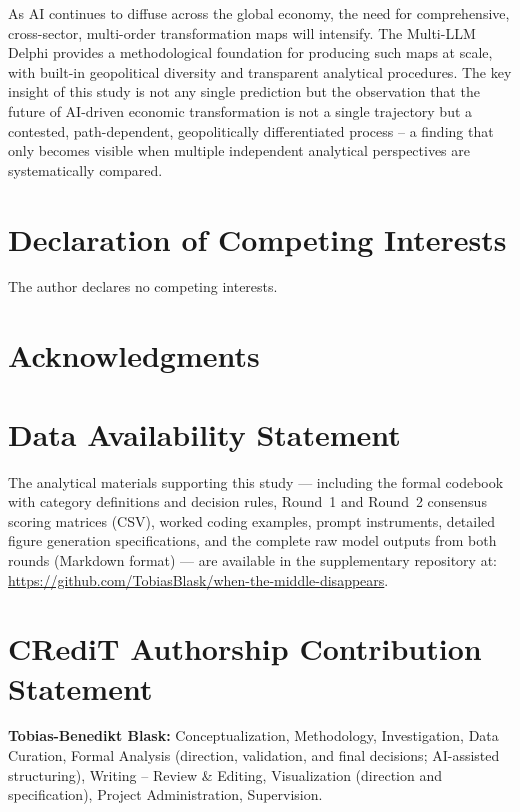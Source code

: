 \documentclass[preprint,review,12pt]{elsarticle}
\begin{document}
As AI continues to diffuse across the global economy, the need for comprehensive, cross-sector, multi-order transformation maps will intensify. The Multi-LLM Delphi provides a methodological foundation for producing such maps at scale, with built-in geopolitical diversity and transparent analytical procedures. The key insight of this study is not any single prediction but the observation that the future of AI-driven economic transformation is not a single trajectory but a contested, path-dependent, geopolitically differentiated process -- a finding that only becomes visible when multiple independent analytical perspectives are systematically compared.


\section*{Declaration of Competing Interests}

The author declares no competing interests.

\section*{Acknowledgments}

\section*{Data Availability Statement}

The analytical materials supporting this study --- including the formal codebook with category definitions and decision rules, Round~1 and Round~2 consensus scoring matrices (CSV), worked coding examples, prompt instruments, detailed figure generation specifications, and the complete raw model outputs from both rounds (Markdown format) --- are available in the supplementary repository at: \url{https://github.com/TobiasBlask/when-the-middle-disappears}.

\section*{CRediT Authorship Contribution Statement}

\textbf{Tobias-Benedikt Blask:} Conceptualization, Methodology, Investigation, Data Curation, Formal Analysis (direction, validation, and final decisions; AI-assisted structuring), Writing -- Review \& Editing, Visualization (direction and specification), Project Administration, Supervision.
\end{document}
